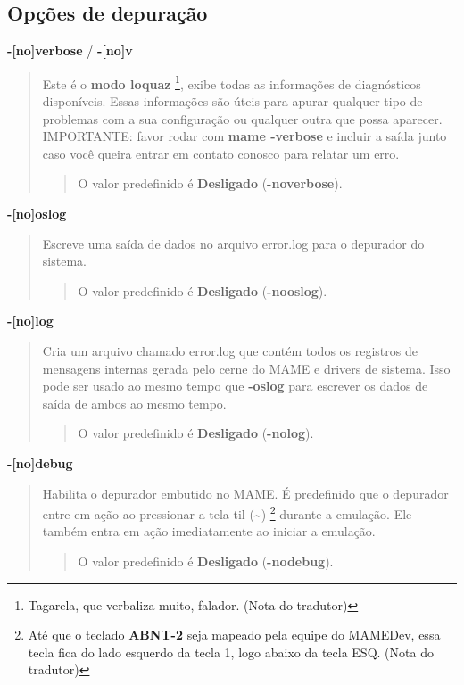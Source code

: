 \documentclass[letterpaper,10pt,brazil]{sphinxmanual}
\begin{document}
\subsection{Opções de depuração}
\label{commandline/commandline-all:opcoes-de-depuracao}\label{commandline/commandline-all:mame-commandline-verbose}
\textbf{-{[}no{]}verbose} / \textbf{-{[}no{]}v}
\begin{quote}

Este é o \textbf{modo loquaz} \footnote[7]{\sphinxAtStartFootnote%
Tagarela, que verbaliza muito, falador. (Nota do tradutor)
}, exibe todas as informações de
diagnósticos disponíveis.
Essas informações são úteis para apurar qualquer tipo de problemas
com a sua configuração ou qualquer outra que possa aparecer.
IMPORTANTE: favor rodar com \textbf{mame -verbose} e incluir a
saída junto caso você queira entrar em contato conosco para relatar
um erro.
\begin{quote}

O valor predefinido é \textbf{Desligado} (\textbf{-noverbose}).
\end{quote}
\end{quote}
\label{commandline/commandline-all:mame-commandline-oslog}
\textbf{-{[}no{]}oslog}
\begin{quote}

Escreve uma saída de dados no arquivo error.log para o depurador do
sistema.
\begin{quote}

O valor predefinido é \textbf{Desligado} (\textbf{-nooslog}).
\end{quote}
\end{quote}
\label{commandline/commandline-all:mame-commandline-log}
\textbf{-{[}no{]}log}
\begin{quote}

Cria um arquivo chamado error.log que contém todos os registros de
mensagens internas gerada pelo cerne do MAME e drivers de sistema.
Isso pode ser usado ao mesmo tempo que \textbf{-oslog} para escrever os
dados de saída de ambos ao mesmo tempo.
\begin{quote}

O valor predefinido é \textbf{Desligado} (\textbf{-nolog}).
\end{quote}
\end{quote}
\label{commandline/commandline-all:mame-commandline-debug}
\textbf{-{[}no{]}debug}
\begin{quote}

Habilita o depurador embutido no MAME. É predefinido que o depurador
entre em ação ao pressionar a tela til (\textbf{\textasciitilde{}}) \footnote[8]{\sphinxAtStartFootnote%
Até que o teclado \textbf{ABNT-2} seja mapeado pela equipe do MAMEDev,
essa tecla fica do lado esquerdo da tecla 1, logo abaixo da
tecla ESQ. (Nota do tradutor)
} durante a
emulação.
Ele também entra em ação imediatamente ao iniciar a emulação.
\begin{quote}

O valor predefinido é \textbf{Desligado} (\textbf{-nodebug}).
\end{quote}
\end{quote}
\end{document}
